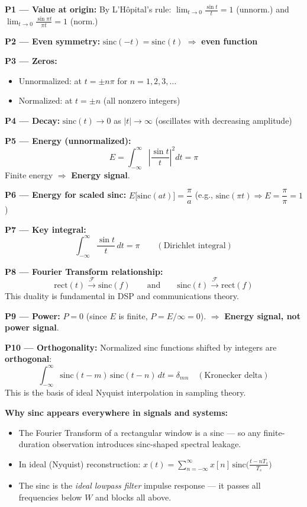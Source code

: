 \documentclass[10pt,a4paper]{article}
\newcommand{\Int}{\displaystyle\int_{-\infty}^{\infty}}
\begin{document}
\begin{propbox}
\textbf{P1 --- Value at origin:} By L'Hôpital's rule: $\lim_{t\to0}\frac{\sin t}{t}=1$ (unnorm.) and $\lim_{t\to0}\frac{\sin\pi t}{\pi t}=1$ (norm.)

\medskip
\textbf{P2 --- Even symmetry:} $\text{sinc}(-t) = \text{sinc}(t)$ $\Rightarrow$ \textbf{even function}

\medskip
\textbf{P3 --- Zeros:}
\begin{itemize}
  \item Unnormalized: at $t = \pm n\pi$ for $n = 1, 2, 3, \ldots$
  \item Normalized: at $t = \pm n$ (all nonzero integers)
\end{itemize}

\medskip
\textbf{P4 --- Decay:} $\text{sinc}(t) \to 0$ as $|t| \to \infty$ (oscillates with decreasing amplitude)

\medskip
\textbf{P5 --- Energy (unnormalized):}
\[
  E = \Int \left|\frac{\sin t}{t}\right|^2 dt = \pi
\]
Finite energy $\Rightarrow$ \textbf{Energy signal}.

\medskip
\textbf{P6 --- Energy for scaled sinc:}
$E\bigl[\text{sinc}(at)\bigr] = \dfrac{\pi}{a}$ \quad (e.g., $\text{sinc}(\pi t) \Rightarrow E = \dfrac{\pi}{\pi} = 1$)

\medskip
\textbf{P7 --- Key integral:}
\[
  \Int \frac{\sin t}{t}\,dt = \pi \qquad (\text{Dirichlet integral})
\]

\medskip
\textbf{P8 --- Fourier Transform relationship:}
\[
  \text{rect}(t) \xrightarrow{\mathcal{F}} \text{sinc}(f) \qquad\text{and}\qquad \text{sinc}(t) \xrightarrow{\mathcal{F}} \text{rect}(f)
\]
This duality is fundamental in DSP and communications theory.

\medskip
\textbf{P9 --- Power:} $P = 0$ (since $E$ is finite, $P = E / \infty = 0$). $\Rightarrow$ \textbf{Energy signal, not power signal}.

\medskip
\textbf{P10 --- Orthogonality:} Normalized sinc functions shifted by integers are \textbf{orthogonal}:
\[
  \Int \text{sinc}(t-m)\,\text{sinc}(t-n)\,dt = \delta_{mn} \quad (\text{Kronecker delta})
\]
This is the basis of ideal Nyquist interpolation in sampling theory.
\end{propbox}

\begin{notebox}
\textbf{Why sinc appears everywhere in signals and systems:}
\begin{itemize}
  \item The Fourier Transform of a rectangular window is a sinc --- so any finite-duration observation introduces sinc-shaped spectral leakage.
  \item In ideal (Nyquist) reconstruction: $x(t) = \sum_{n=-\infty}^{\infty} x[n]\,\text{sinc}\!\bigl(\tfrac{t-nT_s}{T_s}\bigr)$
  \item The sinc is the \emph{ideal lowpass filter} impulse response --- it passes all frequencies below $W$ and blocks all above.
\end{itemize}
\end{notebox}
\end{document}
